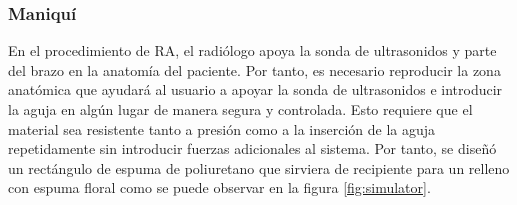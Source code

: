\subsubsection{Maniquí} 
En el procedimiento de \ac{RA}, el radiólogo apoya la sonda de ultrasonidos y parte del brazo en la anatomía del paciente. Por tanto, es necesario reproducir la zona anatómica que ayudará al usuario a apoyar la sonda de ultrasonidos e introducir la aguja en algún lugar de manera segura y controlada. Esto requiere que el material sea resistente tanto a presión como a la inserción de la aguja repetidamente sin introducir fuerzas adicionales al sistema. Por tanto, se diseñó un rectángulo de espuma de poliuretano que sirviera de recipiente para un relleno con espuma floral como se puede observar en la figura \ref{fig:simulator}.






